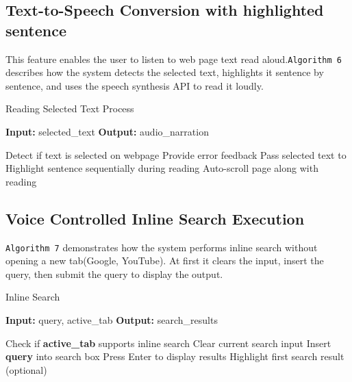 \vspace{1in}

\subsection{Text-to-Speech Conversion with highlighted sentence}

This feature enables the user to listen to web page text read aloud.\texttt{Algorithm 6} describes how the system detects the selected text, highlights it sentence by sentence, and uses the speech synthesis API to read it loudly.

\begin{algorithm}[H]
    \caption{Reading Selected Text Process}
    \label{alg:read_text}
    \textbf{Input:} selected\_text  
    \textbf{Output:} audio\_narration  
    \begin{algorithmic}[1]
        \State Detect if text is selected on webpage
            \State Provide error feedback 
        \Else 
            \State Pass selected text to 
            \State Highlight sentence sequentially during reading
            \State Auto-scroll page along with reading
        \EndIf
    \end{algorithmic}
\end{algorithm}


\subsection{Voice Controlled Inline Search Execution }

\texttt{Algorithm 7} demonstrates how the system performs inline search without opening a new tab(Google, YouTube). At first it clears the input, insert the query, then submit the query to display the output.

\begin{algorithm}[H] 
    \caption{Inline Search}
    \label{alg:inline_search}
    \textbf{Input:} query, active\_tab
    \textbf{Output:} search\_results
    \begin{algorithmic}[1]
        \State Check if \textbf{active\_tab} supports inline search
        \State Clear current search input
        \State Insert \textbf{query} into search box
        \State Press Enter to display results
        \State Highlight first search result (optional)
    \end{algorithmic}
\end{algorithm}


